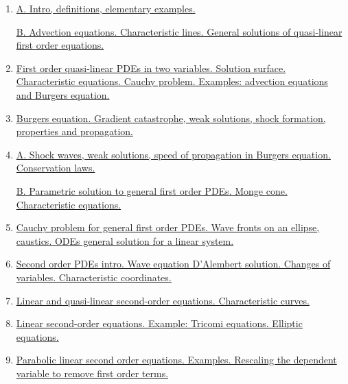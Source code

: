 \documentclass[11pt]{article}
\begin{document}
\begin{enumerate}
	\item \href{https://mp.weixin.qq.com/s/dLT6yiuf2pMBQNuqF_nxfg}{A. Intro, definitions, elementary examples.}
	
	\href{https://mp.weixin.qq.com/s/18U8FeuH26qPEf8ydBPqLA}{B. Advection equations. Characteristic lines. General solutions of quasi-linear first order equations.}
	
	\item \href{https://mp.weixin.qq.com/s/7jZv-987_H_a2UUG_5nKiQ}{First order quasi-linear PDEs in two variables. Solution surface. Characteristic equations. Cauchy problem. Examples: advection equations and Burgers equation.}
	
	\item \href{https://mp.weixin.qq.com/s/6iqnLYg5bDoSQSR-nvivzg}{Burgers equation. Gradient catastrophe, weak solutions, shock formation, properties and propagation.}
	
	\item \href{https://mp.weixin.qq.com/s/9bv77zpK7r0xl55vrkuBVQ}{A. Shock waves, weak solutions, speed of propagation in Burgers equation. Conservation laws.}
	
	\href{https://mp.weixin.qq.com/s/KPDHXgHfJNiI8_JtDXiOpQ}{B. Parametric solution to general first order PDEs. Monge cone. Characteristic equations.}
	
	\item \href{https://mp.weixin.qq.com/s/fjC-d_55icoU637g1Ls-og}{Cauchy problem for general first order PDEs. Wave fronts on an ellipse, caustics. ODEs general solution for a linear system.}
	
	\item \href{https://mp.weixin.qq.com/s/UebIKpUs2Tb_a4ewJ4yRJQ}{Second order PDEs intro. Wave equation D'Alembert solution. Changes of variables. Characteristic coordinates.}
	
	\item \href{https://mp.weixin.qq.com/s/QfZpCxv-SNHSQ0_A9Ihjdw}{Linear and quasi-linear second-order equations. Characteristic curves.}
	
	\item \href{https://mp.weixin.qq.com/s/XTMi7ZISujkl46H452DWlQ}{Linear second-order equations. Example: Tricomi equations. Elliptic equations.}
	
	\item \href{https://mp.weixin.qq.com/s/hrqzhUJWTlD5lJ_rEQ0m5w}{Parabolic linear second order equations. Examples. Rescaling the dependent variable to remove first order terms.}
	

\end{enumerate}
\end{document}
